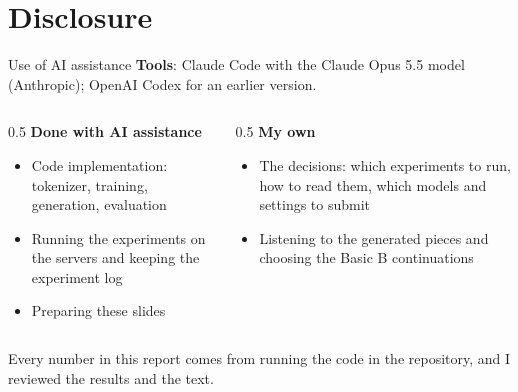 \documentclass[aspectratio=169,11pt]{beamer}
\begin{document}
\section{Disclosure}
\begin{frame}{Use of AI assistance}
  \textbf{Tools}: Claude Code with the Claude Opus 5.5 model (Anthropic); OpenAI Codex for an earlier version.
  \vspace{0.6em}

  \begin{columns}[T]
    \begin{column}{0.5\textwidth}
      \textbf{Done with AI assistance}
      \begin{itemize}\small
        \item Code implementation: tokenizer, training, generation, evaluation
        \item Running the experiments on the servers and keeping the experiment log
        \item Preparing these slides
      \end{itemize}
    \end{column}
    \begin{column}{0.5\textwidth}
      \textbf{My own}
      \begin{itemize}\small
        \item The decisions: which experiments to run, how to read them, which models and settings to submit
        \item Listening to the generated pieces and choosing the Basic B continuations
      \end{itemize}
    \end{column}
  \end{columns}
  \vspace{0.8em}
  {\small Every number in this report comes from running the code in the repository, and I reviewed the results and the text.\par}
\end{frame}

\end{document}
